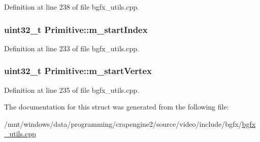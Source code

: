 Definition at line 238 of file bgfx\+\_\+utils.\+cpp.

\hypertarget{struct_primitive_a524dcc6919c7db516cf2cc3966c822a9}{
\subsubsection[{m\+\_\+start\+Index}]{\setlength{\rightskip}{0pt plus 5cm}uint32\+\_\+t Primitive\+::m\+\_\+start\+Index}}\label{struct_primitive_a524dcc6919c7db516cf2cc3966c822a9}


Definition at line 233 of file bgfx\+\_\+utils.\+cpp.

\hypertarget{struct_primitive_a7b688e027923f1db6199297091f18ac1}{
\subsubsection[{m\+\_\+start\+Vertex}]{\setlength{\rightskip}{0pt plus 5cm}uint32\+\_\+t Primitive\+::m\+\_\+start\+Vertex}}\label{struct_primitive_a7b688e027923f1db6199297091f18ac1}


Definition at line 235 of file bgfx\+\_\+utils.\+cpp.



The documentation for this struct was generated from the following file\+:\begin{DoxyCompactItemize}
\item 
/mnt/windows/data/programming/crapengine2/source/video/include/bgfx/\hyperlink{bgfx__utils_8cpp}{bgfx\+\_\+utils.\+cpp}\end{DoxyCompactItemize}
